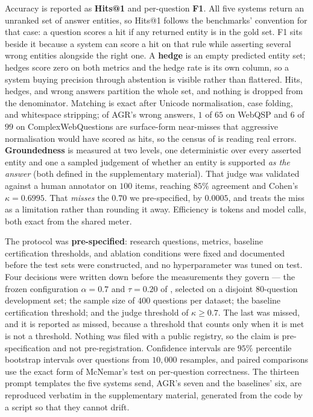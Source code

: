 Accuracy is reported as \textbf{Hits@1} and per-question \textbf{F1}.
All five systems return an unranked set of answer entities, so Hits@1
follows the benchmarks' convention for that case: a question scores a
hit if any returned entity is in the gold set. F1 sits beside it because
a system can score a hit on that rule while asserting several wrong
entities alongside the right one. A \textbf{hedge} is an empty predicted
entity set; hedges score zero on both metrics and the hedge rate is its
own column, so a system buying precision through abstention is visible
rather than flattered. Hits, hedges, and wrong answers partition the
whole set, and nothing is dropped from the denominator. Matching is
exact after Unicode normalisation, case folding, and whitespace
stripping; of AGR's wrong answers, $1$ of $65$ on WebQSP and $6$ of $99$
on ComplexWebQuestions are surface-form near-misses that aggressive
normalisation would have scored as hits, so the census of
 is reading real errors. \textbf{Groundedness}
is measured at two levels, one deterministic over every asserted entity
and one a sampled judgement of whether an entity is supported \emph{as
the answer} (both defined in the supplementary material). That judge was
validated against a human annotator on $100$ items, reaching $85\%$
agreement and Cohen's $\kappa = 0.6995$. That \emph{misses} the $0.70$
we pre-specified, by $0.0005$, and  treats the miss
as a limitation rather than rounding it away. Efficiency is tokens and
model calls, both exact from the shared meter.


The protocol was \textbf{pre-specified}: research questions, metrics,
baseline certification thresholds, and ablation conditions were fixed
and documented before the test sets were constructed, and no
hyperparameter was tuned on test. Four decisions were written down
before the measurements they govern --- the frozen configuration $\alpha
= 0.7$ and $\tau = 0.20$ of , selected on a disjoint
$80$-question development set; the sample size of $400$ questions per
dataset; the baseline certification threshold; and the judge threshold
of $\kappa \geq 0.7$. The last was missed, and it is reported as missed,
because a threshold that counts only when it is met is not a threshold.
Nothing was filed with a public registry, so the claim is
pre-specification and not pre-registration. Confidence intervals are
$95\%$ percentile bootstrap intervals over questions from $10{,}000$
resamples, and paired comparisons use the exact form of McNemar's test
on per-question correctness. The thirteen prompt templates the five
systems send, AGR's seven and the baselines' six, are reproduced
verbatim in the supplementary material, generated from the code by a
script so that they cannot drift.
